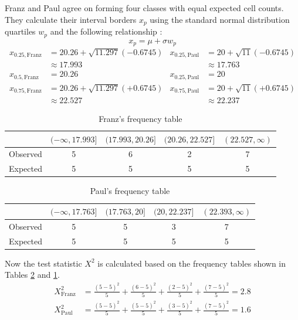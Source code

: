 \documentclass{article}
\theoremstyle{definition}
\begin{document}
Franz and Paul agree on forming four classes with equal expected cell counts.
They calculate their interval borders $x_p$ using the standard normal distribution quartiles $w_p$ and the following relationship \cite{conover1980practical}:
\begin{equation*}
	x_p = \mu + \sigma w_p
\end{equation*}
%
\begin{align*}
	x_{0.25, \text{Franz}} &= 20.26 + \sqrt{11.297}(-0.6745) & x_{0.25, \text{Paul}} &= 20 + \sqrt{11}(-0.6745) \\
	&\approx 17.993 & &\approx 17.763 \\[1ex]
	x_{0.5, \text{Franz}} &= 20.26 & x_{0.25, \text{Paul}} &= 20 \\[1ex]
	x_{0.75, \text{Franz}} &= 20.26 + \sqrt{11.297}(+0.6745) & x_{0.75, \text{Paul}} &= 20 + \sqrt{11}(+0.6745) \\
	&\approx 22.527 & &\approx 22.237
\end{align*}
%
\begin{table}[htb]
\center
\caption{Franz's frequency table}
\label{tbl:chisq:ex:franz}
\begin{tabular}{l|cccc}
	& $(-\infty, 17.993]$ & $(17.993, 20.26]$ & $(20.26, 22.527]$ & $(22.527,\infty)$ \\
	\hline
	Observed & 5 & 6 & 2 & 7 \\
	Expected & 5 & 5 & 5 & 5 \\
\end{tabular}
\end{table}
\begin{table}[htb]
\center
\caption{Paul's frequency table}
\label{tbl:chisq:ex:paul}
\begin{tabular}{l|cccc}
	& $(-\infty, 17.763]$ & $(17.763, 20]$ & $(20, 22.237]$ & $(22.393,\infty)$ \\
	\hline
	Observed & 5 & 5 & 3 & 7 \\
	Expected & 5 & 5 & 5 & 5 \\
\end{tabular}
\end{table}
Now the test statistic $X^2$ is calculated based on the frequency tables shown in Tables \ref{tbl:chisq:ex:paul} and \ref{tbl:chisq:ex:franz}.
\begin{align*}
	X^2_{\text{Franz}} &= \frac{(5-5)^2}{5} + \frac{(6-5)^2}{5} + \frac{(2-5)^2}{5} + \frac{(7-5)^2}{5} = 2.8
	\\[1ex]
	X^2_{\text{Paul}} &= \frac{(5-5)^2}{5} + \frac{(5-5)^2}{5} + \frac{(3-5)^2}{5} + \frac{(7-5)^2}{5} = 1.6
\end{align*}
\end{document}
